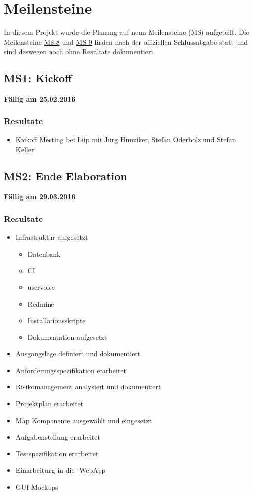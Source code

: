 \section{Meilensteine}
\label{pm-meilensteine}

In diesem Projekt wurde die Planung auf neun Meilensteine (MS) aufgeteilt. 
Die Meilensteine \hyperref[pm-ms8]{MS 8} und \hyperref[pm-ms9]{MS 9} finden nach der offiziellen Schlussabgabe statt und sind deswegen noch ohne Resultate dokumentiert.

\subsection{MS1: Kickoff}
\label{pm-ms1}
\textbf{Fällig am 25.02.2016}
\subsubsection{Resultate}
\begin{itemize}
	\item Kickoff Meeting bei Liip mit Jürg Hunziker, Stefan Oderbolz und Stefan Keller
\end{itemize}

\subsection{MS2: Ende Elaboration}
\label{pm-ms2}
\textbf{Fällig am 29.03.2016}
\subsubsection{Resultate}
\begin{itemize}
	\item Infrastruktur aufgesetzt
	\begin{itemize}
		\item Datenbank
		\item \gls{CI}
		\item uservoice
		\item Redmine
		\item Installationsskripte
		\item Dokumentation aufgesetzt
	\end{itemize}
	\item Ausgangslage definiert und dokumentiert
	\item Anforderungsspezifikation erarbeitet
	\item Risikomanagement analysiert und dokumentiert
	\item Projektplan erarbeitet
	\item Map Komponente ausgewählt und eingesetzt
	\item Aufgabenstellung erarbeitet
	\item Testspezifikation erarbeitet
	\item Einarbeitung in die \kort{}-\gls{WebApp}
	\item \gls{GUI}-Mockups
\end{itemize}

